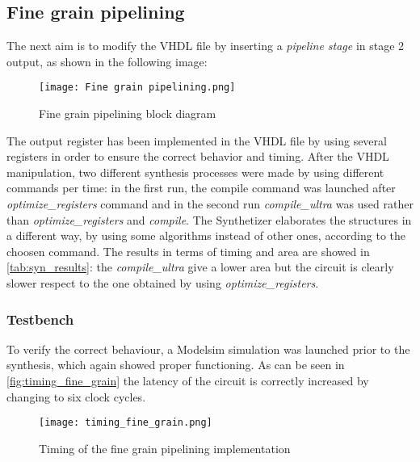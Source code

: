 \subsection{Fine grain pipelining}
The next aim is to modify the VHDL file by inserting a \textit{pipeline stage} in stage 2 output, as shown in the following image:
\begin{figure}[H]
	\center
	\texttt{[image: Fine grain pipelining.png]}
	\caption{Fine grain pipelining block diagram}
	\label{fig:mult_struct}
\end{figure}
The output register has been implemented in the VHDL file by using several registers in order to ensure the correct behavior and timing.  After the VHDL manipulation, two different synthesis processes were made by using different commands per time: in the first run, the compile command was launched after \textit{optimize\_registers} command and in the second run  \textit{compile\_ultra} was used rather than \textit{optimize\_registers} and \textit{compile}. The Synthetizer elaborates the structures in a different way, by using some algorithms instead of other ones, according to the choosen command. The results in terms of timing and area are showed in \autoref{tab:syn_results}: the \textit{compile\_ultra} give a lower area but the circuit is clearly slower respect to the one obtained by using \textit{optimize\_registers}.

\subsubsection{Testbench}
To verify the correct behaviour, a Modelsim simulation was launched prior to the synthesis, which again showed proper functioning. As can be seen in \autoref{fig:timing_fine_grain} the latency of the circuit is correctly increased by changing to six clock cycles.

\begin{figure}[h]
	\center
	\texttt{[image: timing\_fine\_grain.png]}
	\caption{Timing of the fine grain pipelining implementation}
	\label{fig:timing_fine_grain}
\end{figure}


